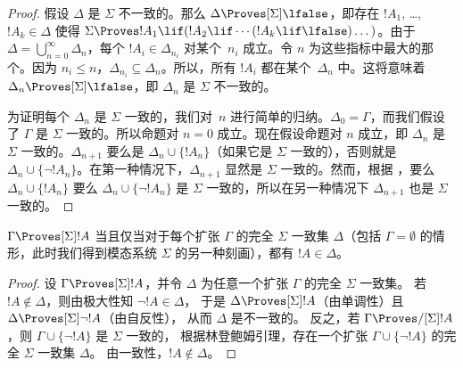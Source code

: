 \documentclass[../../../include/open-logic-section]{subfiles}
\begin{document}
\begin{proof}
假设 $\Delta$ 是 $\Sigma$ 不一致的。那么 $\Delta \Proves[\Sigma] \lfalse$，即存在 $!A_1$, \dots,~$!A_k \in \Delta$ 使得 $\Sigma \Proves !A_1 \lif (!A_2 \lif \cdots (!A_k
\lif \lfalse)\dots)$。由于 $\Delta = \bigcup_{n=0}^\infty \Delta_n$，每个 $!A_i \in \Delta_{n_i}$ 对某个~$n_i$ 成立。令 $n$ 为这些指标中最大的那个。因为 $n_i \le n$，$\Delta_{n_i} \subseteq \Delta_n$。所以，所有 $!A_i$ 都在某个~$\Delta_n$ 中。这将意味着 $\Delta_n \Proves[\Sigma] \lfalse$，即 $\Delta_n$ 是 $\Sigma$ 不一致的。

为证明每个 $\Delta_n$ 是 $\Sigma$ 一致的，我们对~$n$ 进行简单的归纳。$\Delta_0 = \Gamma$，而我们假设了 $\Gamma$ 是 $\Sigma$ 一致的。所以命题对 $n = 0$ 成立。现在假设命题对 $n$ 成立，即 $\Delta_n$ 是 $\Sigma$ 一致的。$\Delta_{n+1}$ 要么是 $\Delta_n \cup \{!A_n\}$（如果它是 $\Sigma$ 一致的），否则就是 $\Delta_n \cup \{\lnot!A_n\}$。在第一种情况下，$\Delta_{n+1}$ 显然是 $\Sigma$ 一致的。然而，根据 ，要么 $\Delta_n \cup \{!A_n\}$ 要么 $\Delta_n \cup \{\lnot!A_n\}$ 是 $\Sigma$ 一致的，所以在另一种情况下 $\Delta_{n+1}$ 也是 $\Sigma$ 一致的。
\end{proof}

\begin{cor}
  $\Gamma \Proves[\Sigma] !A$ 当且仅当对于每个扩张 $\Gamma$ 的完全 $\Sigma$ 一致集 $\Delta$（包括 $\Gamma = \emptyset$ 的情形，此时我们得到模态系统 $\Sigma$ 的另一种刻画），都有 $!A \in \Delta$。
\end{cor}

\begin{proof}
  设 $\Gamma \Proves[\Sigma] !A$，并令 $\Delta$ 为任意一个扩张 $\Gamma$ 的完全 $\Sigma$ 一致集。
  若 $!A \notin \Delta$，则由极大性知 $\lnot!A \in \Delta$，
  于是 $\Delta \Proves[\Sigma] !A$（由单调性）且 $\Delta \Proves[\Sigma] \lnot!A$（由自反性），
  从而 $\Delta$ 是不一致的。
  反之，若 $\Gamma \Proves/[\Sigma] !A$，则 $\Gamma \cup \{ \lnot!A\}$ 是 $\Sigma$ 一致的，
  根据林登鲍姆引理，存在一个扩张 $\Gamma \cup \{ \lnot!A \}$ 的完全 $\Sigma$ 一致集 $\Delta$。
  由一致性，$!A \notin \Delta$。
\end{proof}
\end{document}
